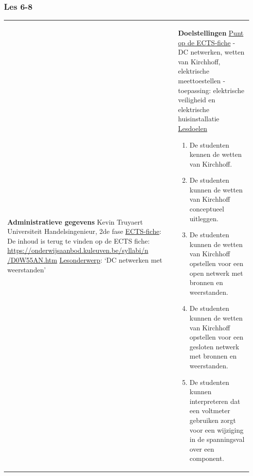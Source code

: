 


\begin{landscape}
	
	\subsubsection{Les 6-8}
	\begin{tabularx}{1.56\textwidth}{|p{}|X|}\hline
		\textbf{Administratieve gegevens}\newline\newline
		Kevin Truyaert\newline\newline
		Universiteit\newline
		Handelsingenieur, 2de fase\newline
		\underline{ECTS-fiche}: De inhoud is terug te vinden op de ECTS fiche: \href{https://onderwijsaanbod.kuleuven.be/syllabi/n/D0W55AN.htm}{https://onderwijsaanbod.kuleuven.be/syllabi/n /D0W55AN.htm} \newline
		\underline{Lesonderwerp}: `DC netwerken met weerstanden' & \textbf{Doelstellingen}\newline\vspace{0.5cm}
		\underline{Punt op de ECTS-fiche}
		\vspace{-0.5cm}\newline  - DC netwerken, wetten van Kirchhoff, elektrische meettoestellen \newline - toepassing: elektrische veiligheid en elektrische huisinstallatie \newline
		\underline{Lesdoelen}\newline
		\vspace{-0.5cm}
		\begin{enumerate}[itemsep=0.08\baselineskip]
			\item De studenten kennen de wetten van Kirchhoff.
			\item De studenten kunnen de wetten van Kirchhoff conceptueel uitleggen.
			\item De studenten kunnen de wetten van Kirchhoff opstellen voor een open netwerk met bronnen en weerstanden.
			\item De studenten kunnen de wetten van Kirchhoff opstellen voor een gesloten netwerk met bronnen en weerstanden.
			\item De studenten kunnen interpreteren dat een voltmeter gebruiken zorgt voor een wijziging in de spanningsval over een component. 

\end{enumerate}
\end{tabularx}
\end{landscape}
